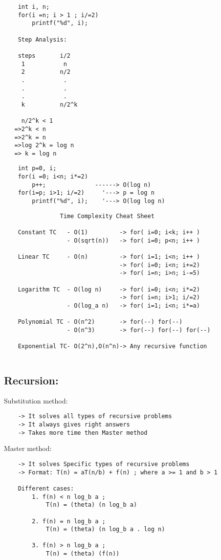 \documentclass{article}
\begin{document}
\hrulefill
\begin{verbatim}
    int i, n;
    for(i =n; i > 1 ; i/=2)
        printf("%d", i);

    Step Analysis:
    
    steps       i/2
     1           n
     2          n/2
     .           .
     .           .
     .           .
     k          n/2^k  

     n/2^k < 1
   =>2^k < n
   =>2^k = n
   =>log 2^k = log n
   => k = log n
\end{verbatim}
\hrulefill
\begin{verbatim}
    int p=0, i;
    for(i =0; i<n; i*=2)
        p++;              ------> O(log n)
    for(i=p; i>1; i/=2)     '---> p = log n
        printf("%d", i);    '---> O(log log n)
\end{verbatim}
\hrulefill
\newpage
\hrulefill
\begin{verbatim}
                Time Complexity Cheat Sheet
                
    Constant TC   - O(1)         -> for( i=0; i<k; i++ )
                  - O(sqrt(n))   -> for( i=0; p<n; i++ )

    Linear TC     - O(n)         -> for( i=1; i<n; i++ )
                                 -> for( i=0; i<n; i+=2)
                                 -> for( i=n; i>n; i-=5)

    Logarithm TC  - O(log n)     -> for( i=0; i<n; i*=2)
                                 -> for( i=n; i>1; i/=2)
                  - O(log_a n)   -> for( i=1; i<n; i*=a)

    Polynomial TC - O(n^2)       -> for(--) for(--)
                  - O(n^3)       -> for(--) for(--) for(--)

    Exponential TC- O(2^n),O(n^n)-> Any recursive function
 
\end{verbatim}
\hrulefill

\subsection*{Recursion:}

Substitution method:
\begin{verbatim}
    -> It solves all types of recursive problems
    -> It always gives right answers
    -> Takes more time then Master method
\end{verbatim}

Master method:
\begin{verbatim}
    -> It solves Specific types of recursive problems
    -> Format: T(n) = aT(n/b) + f(n) ; where a >= 1 and b > 1

    Different cases:
        1. f(n) < n log_b a ; 
            T(n) = (theta) (n log_b a)

        2. f(n) = n log_b a ; 
            T(n) = (theta) (n log_b a . log n)

        3. f(n) > n log_b a ; 
            T(n) = (theta) (f(n))
\end{verbatim}
\hrulefill
\newpage
\end{document}
